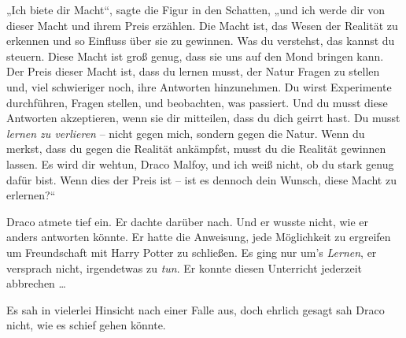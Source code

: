 „Ich biete dir Macht“, sagte die Figur in den Schatten, „und ich werde dir von dieser Macht und ihrem Preis erzählen. Die Macht ist, das Wesen der Realität zu erkennen und so Einfluss über sie zu gewinnen. Was du verstehst, das kannst du steuern. Diese Macht ist groß genug, dass sie uns auf den Mond bringen kann. Der Preis dieser Macht ist, dass du lernen musst, der Natur Fragen zu stellen und, viel schwieriger noch, ihre Antworten hinzunehmen. Du wirst Experimente durchführen, Fragen stellen, und beobachten, was passiert. Und du musst diese Antworten akzeptieren, wenn sie dir mitteilen, dass du dich geirrt hast. Du musst \emph{lernen zu verlieren} – nicht gegen mich, sondern gegen die Natur. Wenn du merkst, dass du gegen die Realität ankämpfst, musst du die Realität gewinnen lassen. Es wird dir wehtun, Draco Malfoy, und ich weiß nicht, ob du stark genug dafür bist. Wenn dies der Preis ist – ist es dennoch dein Wunsch, diese Macht zu erlernen?“

Draco atmete tief ein. Er dachte darüber nach. Und er wusste nicht, wie er anders antworten könnte. Er hatte die Anweisung, jede Möglichkeit zu ergreifen um Freundschaft mit Harry Potter zu schließen. Es ging nur um’s \emph{Lernen}, er versprach nicht, irgendetwas zu \emph{tun}. Er konnte diesen Unterricht jederzeit abbrechen …

Es sah in vielerlei Hinsicht nach einer Falle aus, doch ehrlich gesagt sah Draco nicht, wie es schief gehen könnte.

